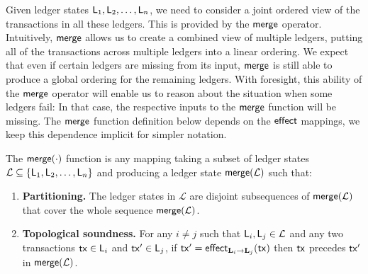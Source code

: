 Given ledger states $\LState_1, \LState_2, \ldots,\LState_n$, we need to
consider a joint ordered view of the transactions in all these ledgers. This is provided
by the  $\merge$ operator. Intuitively, $\merge$  allows us to
create a combined view of multiple ledgers, putting all of the transactions
across multiple ledgers into a linear ordering.
We expect that even if certain ledgers are missing from its input,
$\merge$ is still able to produce a global ordering for the remaining ledgers.
With foresight, this ability of the $\merge$ operator will enable us to reason
about the
situation
when some ledgers fail: In that case, the respective
inputs to the $\merge$ function will be missing. The $\merge$ function
definition below depends on the $\effect$ mappings, we keep this dependence
implicit for simpler notation.

\begin{definition}
  \label{def:merge}
  The $\merge(\cdot)$ function is any mapping taking a
  subset of ledger states $\mathcal{L} \subseteq
  \{\LState_1,\LState_2,\ldots,\LState_n\}$
  and producing a ledger state $\merge(\mathcal{L})$
  such that:
  \begin{enumerate}
    \item \textbf{Partitioning.}
      The ledger states in $\mathcal{L}$ are disjoint subsequences of
      $\merge(\mathcal{L})$ that cover the whole sequence $\merge(\mathcal{L})$.
    \item \textbf{Topological soundness.}
      For any $i\neq j$ such that $\LState_i,\LState_j\in\mathcal{L}$
      and any two transactions $\tx \in
      \LState_i$ and $\tx' \in \LState_j$,
      if $\tx' = \eff{\Ledger_i}{\Ledger_j}(\tx)$
      then $\tx$ precedes $\tx'$ in $\merge(\mathcal{L})$.
  \end{enumerate}
\end{definition}



